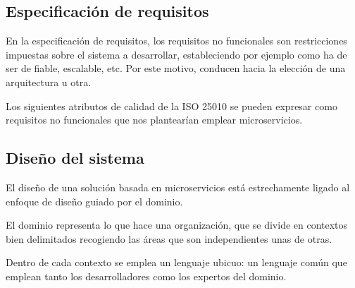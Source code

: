 \documentclass[11pt,a4paper]{article}
\begin{document}
\subsection{Especificación de requisitos}

En la especificación de requisitos, los requisitos no funcionales son restricciones impuestas sobre el sistema a desarrollar, estableciendo por ejemplo como ha de ser de fiable, escalable, etc. Por este motivo, conducen hacia la elección de una arquitectura u otra.

Los siguientes atributos de calidad de la ISO 25010 se pueden expresar como requisitos no funcionales que nos plantearían emplear microservicios.

\iffalse
\begin{itemize}

\item Según el teorema de CAP, la disponibilidad en los sistemas distribuidos solo se puede garantizar sacrificando una consistencia fuerte por una eventual.

\item En cuanto a la tolerancia de fallos, un sistema será más resiliente si permanece operativo cuando uno de sus microservicios no lo sestá.

\item Sobre la utilización de recursos, los microservicios hacen un mejor aprovechamiento de estos porque solo escalan aquellos servicios que realmente requieren hacerlo.

\item Por último, la capacidad de ser reemplazado se presupone mejor en una arquitectura basada en microservicios porque las piezas de código que gestiona son de menor tamaño.

\end{itemize}
\fi

\subsection{Diseño del sistema}

El diseño de una solución basada en microservicios está estrechamente ligado al enfoque de diseño guiado por el dominio.

El dominio representa lo que hace una organización, que se divide en contextos bien delimitados recogiendo las áreas que son independientes unas de otras. 

Dentro de cada contexto se emplea un lenguaje ubicuo: un lenguaje común que emplean tanto los desarrolladores como los expertos del dominio.
\end{document}
